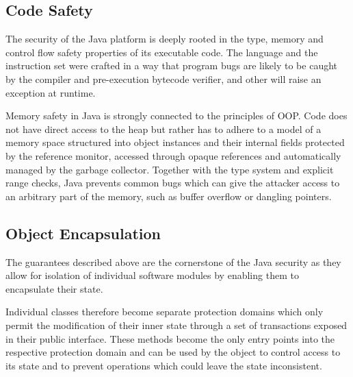\documentclass[a4paper,12pt,twoside,openright]{report}
\begin{document}
\subsection{Code Safety}

The security of the Java platform is deeply rooted in the type, memory and control flow safety properties of its executable code. The language and the instruction set were crafted in a way that program bugs are likely to be caught by the compiler and pre-execution bytecode verifier, and other will raise an exception at runtime. 


Memory safety in Java is strongly connected to the principles of OOP. Code does not have direct access to the heap but rather has to adhere to a model of a memory space structured into object instances and their internal fields protected by the reference monitor, accessed through opaque references and automatically managed by the garbage collector. Together with the type system and explicit range checks, Java prevents common bugs which can give the attacker access to an arbitrary part of the memory, such as buffer overflow or dangling pointers.

\subsection{Object Encapsulation}

The guarantees described above are the cornerstone of the Java security as they allow for isolation of individual software modules by enabling them to encapsulate their state. 

Individual classes therefore become separate protection domains which only permit the modification of their inner state through a set of transactions exposed in their public interface. These methods become the only entry points into the respective protection domain and can be used by the object to control access to its state and to prevent operations which could leave the state inconsistent.
\end{document}
